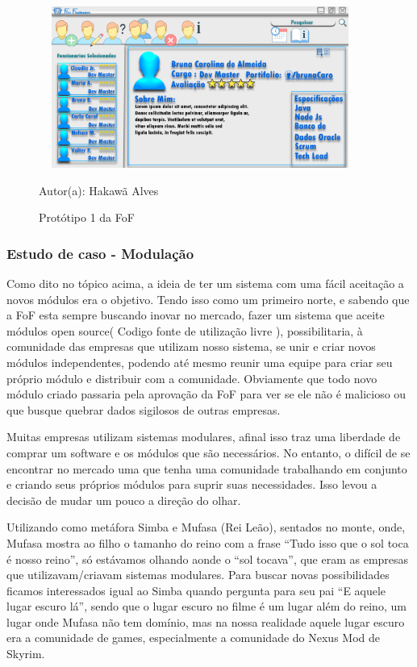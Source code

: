 \begin{figure}[!h]
	\centering
	\caption{Protótipo 1 da FoF}
	\includegraphics[width=400px, height=200px]{./images/prototipo1.png}
	\par{Autor(a): Hakawã Alves}
\end{figure}

\subsubsection{Estudo de caso - Modulação}

Como dito no tópico acima, a ideia de ter um sistema com uma fácil aceitação a novos módulos era o objetivo. Tendo isso como um primeiro norte, e sabendo que a FoF esta sempre buscando inovar no mercado, fazer um sistema que aceite módulos open source( Codigo fonte de utilização livre ), possibilitaria, à comunidade das empresas que utilizam nosso sistema, se unir e criar novos módulos independentes, podendo até mesmo reunir uma equipe para criar seu próprio módulo e distribuir com a comunidade. Obviamente que todo novo módulo criado passaria pela aprovação da FoF para ver se ele não é malicioso ou que busque quebrar dados sigilosos de outras empresas.

Muitas empresas utilizam sistemas modulares, afinal isso traz uma liberdade de comprar um software e os módulos que são necessários. No entanto, o difícil de se encontrar no mercado uma que tenha uma comunidade trabalhando em conjunto e criando seus próprios módulos para suprir suas necessidades. Isso levou a decisão de mudar um pouco a direção do olhar.

Utilizando como metáfora Simba e Mufasa (\citeyearpar{rei-leao}Rei Leão), sentados no monte, onde, Mufasa mostra ao filho o tamanho do reino com a frase “Tudo isso que o sol toca é nosso reino”, só estávamos olhando
aonde o “sol tocava”, que eram as empresas que utilizavam/criavam sistemas modulares. Para buscar   
novas possibilidades ficamos interessados igual ao Simba quando pergunta para seu pai “E aquele lugar escuro lá”, sendo que o lugar escuro no filme é um lugar além do reino, um lugar onde Mufasa não tem domínio, mas na nossa realidade aquele lugar escuro era a comunidade de games, especialmente a comunidade do Nexus Mod de Skyrim.


